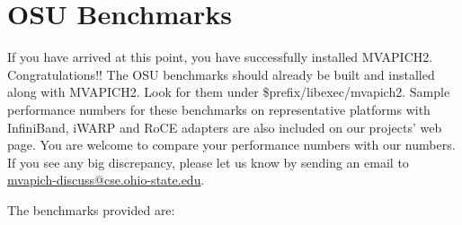 \section{OSU Benchmarks}
\label{sec:osubenchmarks}

If you have arrived at this point, you have successfully installed MVAPICH2.
Congratulations!! The OSU benchmarks should already be built and installed
along with MVAPICH2. Look for them under \$prefix/libexec/mvapich2.
Sample performance numbers for these benchmarks on representative platforms
with InfiniBand, iWARP and RoCE adapters are also included on our projects' web
page. You are welcome to compare your performance numbers with our numbers.  
If you see any big discrepancy, please let us know by sending an email to
\href{mailto:mvapich-discuss@cse.ohio-state.edu}{mvapich-discuss@cse.ohio-state.edu}.
 
The benchmarks provided are:

